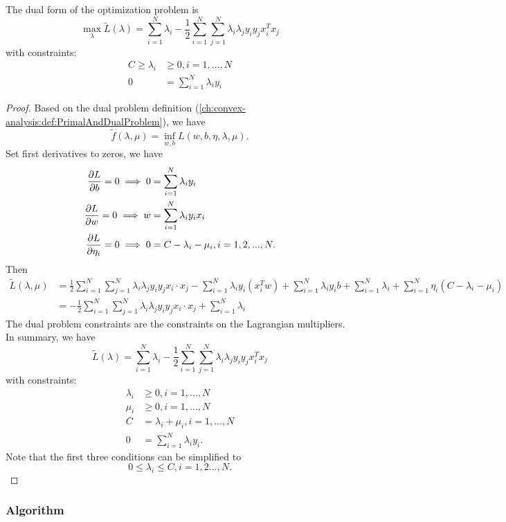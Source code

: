 \begin{refsection}
\begin{theorem}\cite[333]{bishop2006pattern}
	The dual form of the optimization problem is
	$$\max_{\lambda}\tilde{L}(\lambda) = \sum_{i=1}^N \lambda_i - \frac{1}{2}\sum_{i=1}^N\sum_{j=1}^N \lambda_i\lambda_j y_iy_j x_i^Tx_j$$
	with constraints:
	\begin{align*}
	C\geq \lambda_i &\geq 0, i = 1,...,N\\
	0 &= \sum_{i=1}^N \lambda_iy_i
	\end{align*}
\end{theorem}
\begin{proof}
	Based on the dual problem definition (\autoref{ch:convex-analysis:def:PrimalAndDualProblem}), we have
	$$\tilde{f}(\lambda, \mu) = \inf_{w,b} L(w,b,\eta,\lambda,\mu).$$
	Set first derivatives to zeros, we have
	\begin{align*}
	\frac{\partial L}{\partial b} = 0 \implies 0 &= \sum_{i=1}^N \lambda_iy_i\\
	\frac{\partial L}{\partial w} = 0 \implies w &= \sum_{i=1}^N \lambda_iy_ix_i \\
	\frac{\partial L}{\partial \eta_i} = 0 \implies 0 &= C-\lambda_i-\mu_i, i=1,2,...,N.
	\end{align*}
	Then
	\begin{align*}
	\tilde{L}(\lambda,\mu) &=\frac{1}{2}\sum_{i=1}^N\sum_{j=1}^N \lambda_i\lambda_j y_iy_j x_i\cdot x_j - \sum_{i=1}^N \lambda_i y_i(x_i^Tw)  + \sum_{i=1}^N \lambda_iy_ib + \sum_{i=1}^N \lambda_i + \sum_{i=1}^N \eta_i (C - \lambda_i-\mu_i)\\
	&= -\frac{1}{2}\sum_{i=1}^N\sum_{j=1}^N \lambda_i\lambda_j y_iy_j x_i\cdot x_j + \sum_{i=1}^N \lambda_i
	\end{align*}
	The dual problem constraints are the constraints on the Lagrangian multipliers. In summary, we have
	$$\tilde{L}(\lambda) = \sum_{i=1}^N \lambda_i - \frac{1}{2}\sum_{i=1}^N\sum_{j=1}^N \lambda_i\lambda_j y_iy_j x_i^Tx_j$$
	with constraints:
	\begin{align*}
	\lambda_i &\geq 0, i = 1,...,N\\
	\mu_i &\geq 0, i = 1,...,N\\
	C &= \lambda_i + \mu_i , i = 1,...,N\\
	0 &= \sum_{i=1}^N \lambda_iy_i.
	\end{align*}
	Note that the first three conditions can be simplified to 
	$$0\leq \lambda_i\leq C, i =1,2...,N.$$
\end{proof}

\subsubsection{Algorithm}



\end{refsection}
